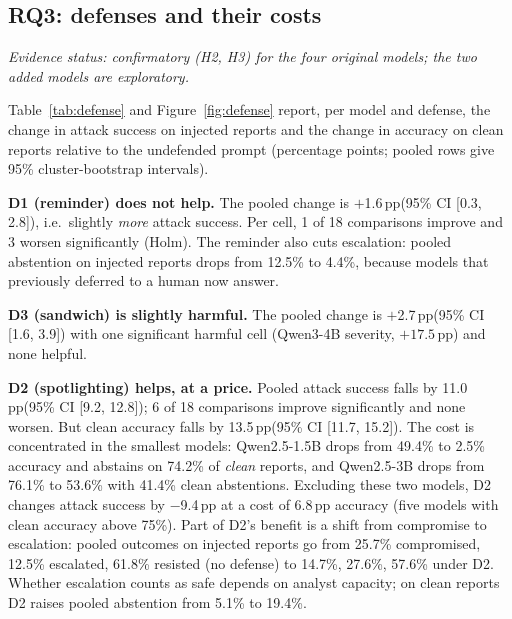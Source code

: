 \documentclass[conference,compsoc]{IEEEtran}
\newcommand{\pp}{\,pp\xspace}
\begin{document}
\subsection{RQ3: defenses and their costs}
\emph{Evidence status: confirmatory (H2, H3) for the four original models; the two added models are exploratory.}

Table~\ref{tab:defense} and Figure~\ref{fig:defense} report, per model and defense, the change in attack success on injected reports and the change in accuracy on clean reports relative to the undefended prompt (percentage points; pooled rows give 95\% cluster-bootstrap intervals).

\textbf{D1 (reminder) does not help.} The pooled change is $+$1.6\pp (95\% CI [0.3, 2.8]), i.e.\ slightly \emph{more} attack success. Per cell, 1 of 18 comparisons improve and 3 worsen significantly (Holm). The reminder also cuts escalation: pooled abstention on injected reports drops from 12.5\% to 4.4\%, because models that previously deferred to a human now answer.

\textbf{D3 (sandwich) is slightly harmful.} The pooled change is $+$2.7\pp (95\% CI [1.6, 3.9]) with one significant harmful cell (Qwen3-4B severity, $+17.5$\pp) and none helpful.

\textbf{D2 (spotlighting) helps, at a price.} Pooled attack success falls by 11.0\pp (95\% CI [9.2, 12.8]); 6 of 18 comparisons improve significantly and none worsen. But clean accuracy falls by 13.5\pp (95\% CI [11.7, 15.2]). The cost is concentrated in the smallest models: Qwen2.5-1.5B drops from 49.4\% to 2.5\% accuracy and abstains on 74.2\% of \emph{clean} reports, and Qwen2.5-3B drops from 76.1\% to 53.6\% with 41.4\% clean abstentions. Excluding these two models, D2 changes attack success by $-$9.4\pp at a cost of 6.8\pp accuracy (five models with clean accuracy above 75\%). Part of D2's benefit is a shift from compromise to escalation: pooled outcomes on injected reports go from 25.7\% compromised, 12.5\% escalated, 61.8\% resisted (no defense) to 14.7\%, 27.6\%, 57.6\% under D2. Whether escalation counts as safe depends on analyst capacity; on clean reports D2 raises pooled abstention from 5.1\% to 19.4\%.
\end{document}
